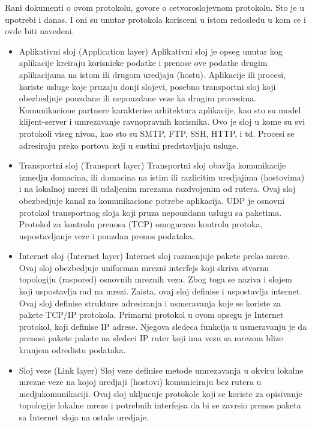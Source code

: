 \documentclass[a4paper,12pt, master]{etf}
\begin{document}
	Rani dokumenti o ovom protokolu, govore o cetvoroslojevnom protokolu. Sto je u upotrebi i 
	danas. I oni su unutar protokola korisceni u istom redosledu u kom ce i ovde biti navedeni.

	\begin{itemize}
		\item Aplikativni sloj (Application layer)
		Aplikativni sloj je opseg unutar kog aplikacije kreiraju korisnicke podatke i prenose 
		ove podatke drugim aplikacijama na istom ili drugom uredjaju (hostu). Aplikacije ili 
		procesi, koriste usluge koje pruzaju donji slojevi, posebno transportni sloj koji 
		obezbedjuje pouzdane ili nepouzdane veze ka drugim procesima. Komunikacione partnere 
		karakterise arhitektura aplikacije, kao sto su model klijent-server i umrezavanje 
		ravnopravnih korisnika. Ovo je sloj u kome su svi protokoli viseg nivoa, kao sto su SMTP,
		 FTP, SSH, HTTP, i td. Procesi se adresiraju preko portova koji u sustini predstavljaju 
		 usluge.
		\item Transportni sloj (Transport layer)
		Transportni sloj obavlja komunikacije izmedju domacina, ili domacina na istim ili 
		razlicitim uredjajima (hostovima) i na lokalnoj mrezi ili udaljenim mrezama razdvojenim 
		od rutera. Ovaj sloj obezbedjuje kanal za komunikacione potrebe aplikacija. UDP je 
		osnovni protokol transportnog sloja koji pruza nepouzdanu uslugu sa paketima. Protokol 
		za kontrolu prenosa (TCP) omogucava kontrolu protoka, uspostavljanje veze i pouzdan 
		prenos podataka.
		\item Internet sloj (Internet layer)
		Internet sloj razmenjuje pakete preko mreze. Ovaj sloj obezbedjuje uniforman mrezni 
		interfejs koji skriva stvarnu topologiju (raspored) osnovnih mreznih veza. Zbog toga se 
		naziva i slojem koji uspostavlja rad na mrezi. Zaista, ovaj sloj definise i uspostavlja 
		internet. Ovaj sloj definise strukture adresiranja i usmeravanja koje se koriste za 
		pakete TCP/IP protokola. Primarni protokol u ovom opsegu je Internet protokol, koji 
		definise IP adrese. Njegova sledeca funkcija u usmeravanju je da prenosi pakete pakete 
		na sledeci IP ruter koji ima vezu sa mrezom blize kranjem odredistu podataka.	
		\item Sloj veze (Link layer)
		Sloj veze definise metode umrezavanja u okviru lokalne mrezne veze na kojoj uredjaji 
		(hostovi) komuniciraju bez rutera u medjukomunikaciji. Ovaj sloj ukljucuje protokole 
		koji se koriste za opisivanje topologije lokalne mreze i potrebnih interfejsa da bi se 
		zavrsio prenos paketa sa Internet sloja na ostale uredjaje.
	\end{itemize}
\end{document}

